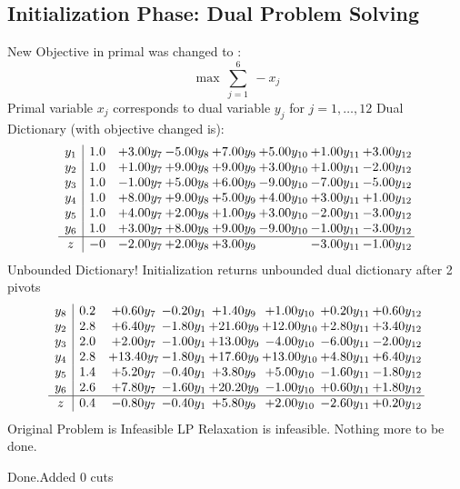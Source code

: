 \documentclass[8pt]{article}
\begin{document}
\subsection{Initialization Phase: Dual Problem Solving}
New Objective in primal was changed to : \[ \max\ \sum_{j=1}^{6}\ - x_j \] 
Primal variable $x_j$ corresponds to dual variable $y_j$ for $j = 1,\ldots,12$
Dual Dictionary (with objective changed is): 
\[\begin{array}{c| c c@{\hskip 2pt} c@{\hskip 2pt} c@{\hskip 2pt} c@{\hskip 2pt} c@{\hskip 2pt} c@{\hskip 2pt} }
 y_{1}   &  1.0 & +  3.00 y_{7} & -5.00 y_{8} & +  7.00 y_{9} & +  5.00 y_{10} & +  1.00 y_{11} & +  3.00 y_{12}\\
 y_{2}   &  1.0 & +  1.00 y_{7} & +  9.00 y_{8} & +  9.00 y_{9} & +  3.00 y_{10} & +  1.00 y_{11} & -2.00 y_{12}\\
 y_{3}   &  1.0 & -1.00 y_{7} & +  5.00 y_{8} & +  6.00 y_{9} & -9.00 y_{10} & -7.00 y_{11} & -5.00 y_{12}\\
 y_{4}   &  1.0 & +  8.00 y_{7} & +  9.00 y_{8} & +  5.00 y_{9} & +  4.00 y_{10} & +  3.00 y_{11} & +  1.00 y_{12}\\
 y_{5}   &  1.0 & +  4.00 y_{7} & +  2.00 y_{8} & +  1.00 y_{9} & +  3.00 y_{10} & -2.00 y_{11} & -3.00 y_{12}\\
 y_{6}   &  1.0 & +  3.00 y_{7} & +  8.00 y_{8} & +  9.00 y_{9} & -9.00 y_{10} & -1.00 y_{11} & -3.00 y_{12}\\
\hline
z    &  -0 & -2.00 y_{7} & +  2.00 y_{8} & +  3.00 y_{9} &   & -3.00 y_{11} & -1.00 y_{12}\\
\end{array}\]
Unbounded Dictionary!
Initialization returns unbounded dual dictionary after 2 pivots
\[\begin{array}{c| c c@{\hskip 2pt} c@{\hskip 2pt} c@{\hskip 2pt} c@{\hskip 2pt} c@{\hskip 2pt} c@{\hskip 2pt} }
 y_{8}   &  0.2 & +  0.60 y_{7} & -0.20 y_{1} & +  1.40 y_{9} & +  1.00 y_{10} & +  0.20 y_{11} & +  0.60 y_{12}\\
 y_{2}   &  2.8 & +  6.40 y_{7} & -1.80 y_{1} & + 21.60 y_{9} & + 12.00 y_{10} & +  2.80 y_{11} & +  3.40 y_{12}\\
 y_{3}   &  2.0 & +  2.00 y_{7} & -1.00 y_{1} & + 13.00 y_{9} & -4.00 y_{10} & -6.00 y_{11} & -2.00 y_{12}\\
 y_{4}   &  2.8 & + 13.40 y_{7} & -1.80 y_{1} & + 17.60 y_{9} & + 13.00 y_{10} & +  4.80 y_{11} & +  6.40 y_{12}\\
 y_{5}   &  1.4 & +  5.20 y_{7} & -0.40 y_{1} & +  3.80 y_{9} & +  5.00 y_{10} & -1.60 y_{11} & -1.80 y_{12}\\
 y_{6}   &  2.6 & +  7.80 y_{7} & -1.60 y_{1} & + 20.20 y_{9} & -1.00 y_{10} & +  0.60 y_{11} & +  1.80 y_{12}\\
\hline
z    &  0.4 & -0.80 y_{7} & -0.40 y_{1} & +  5.80 y_{9} & +  2.00 y_{10} & -2.60 y_{11} & +  0.20 y_{12}\\
\end{array}\]
Original Problem is Infeasible
 LP Relaxation is infeasible. Nothing more to be done. 

Done.Added 0 cuts 
\end{document}
